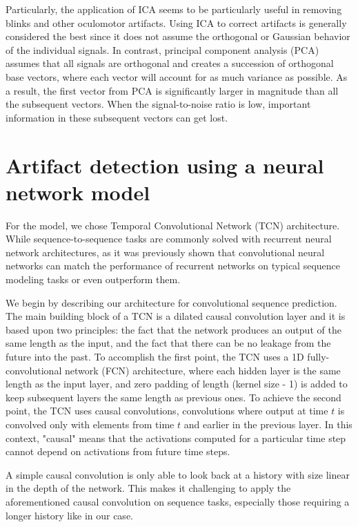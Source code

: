 \documentclass[12pt,a4paper,titlepage,openany]{report}
\begin{document}
Particularly, the application of ICA seems to be particularly useful in removing blinks and other oculomotor artifacts. Using ICA to correct artifacts is generally considered the best since it does not assume the orthogonal or Gaussian behavior of the individual signals. 
In contrast, principal component analysis (PCA) assumes that all signals are orthogonal and creates a succession of orthogonal base vectors, where each vector will account for as much variance as possible. 
As a result, the ﬁrst vector from PCA is signiﬁcantly larger in magnitude than all the subsequent vectors. 
When the signal-to-noise ratio is low, important information in these subsequent vectors can get lost\cite{makkar2023}.

\section{Artifact detection using a neural network model}

For the model, we chose Temporal Convolutional Network (TCN) architecture. While sequence-to-sequence tasks are commonly solved with recurrent neural network architectures, as it was previously shown that convolutional neural networks can match the performance of recurrent networks on typical sequence modeling tasks or even outperform them.

We begin by describing our architecture for convolutional sequence prediction. The main building block of a TCN is a dilated causal convolution layer and it is based upon two principles: the fact that the network produces an output of the same length as the input, and the fact that there can be no leakage from the future into the past. To accomplish the first point, the TCN uses a 1D fully-convolutional network (FCN) architecture, where each hidden layer is the same length as the input layer, and zero padding of length (kernel size - 1) is added to keep subsequent layers the same length as previous ones. To achieve the second point, the TCN uses causal convolutions, convolutions where output at time \(t\) is convolved only with elements from time \(t\) and earlier in the previous layer. In this context, "causal" means that the activations computed for a particular time step cannot depend on activations from future time steps.

A simple causal convolution is only able to look back at a history with size linear in the depth of the network. This makes it challenging to apply the aforementioned causal convolution on sequence tasks, especially those requiring a longer history like in our case.
\end{document}
